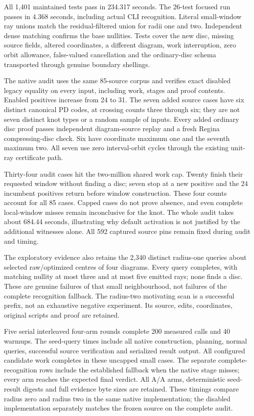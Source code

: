 All 1,401 maintained tests pass in 234.317 seconds. The 26-test focused
run passes in 4.368 seconds, including actual CLI recognition. Literal
small-window ray unions match the residual-filtered union for radii one
and two. Independent dense matching confirms the base nullities. Tests
cover the new disc, missing source fields, altered coordinates, a different
diagram, work interruption, zero orbit allowance, false-valued cancellation
and the ordinary-disc schema transported through genuine boundary shellings.

The native audit uses the same 85-source corpus and verifies exact disabled
legacy equality on every input, including work, stages and proof contents.
Enabled positives increase from 24 to 31. The seven added source cases
have six distinct canonical PD codes, at crossing counts three through six;
they are not seven distinct knot types or a random sample of inputs.
Every added ordinary disc proof passes independent diagram-source replay
and a fresh Regina compressing-disc check. Six have coordinate maximum
one and the seventh maximum two. All seven use zero interval-orbit cycles
through the existing unit-ray certificate path.

Thirty-four audit cases hit the two-million shared work cap. Twenty finish
their requested window without finding a disc; seven stop at a new positive
and the 24 incumbent positives return before window construction. These
four counts account for all 85 cases. Capped cases do not prove absence,
and even complete local-window misses remain inconclusive for the knot.
The whole audit takes about 684.44 seconds, illustrating why default
activation is not justified by the additional witnesses alone. All 592
captured source pins remain fixed during audit and timing.

The exploratory evidence also retains the 2,340 distinct radius-one queries
about selected raw/optimized centres of four diagrams. Every query completes,
with matching nullity at most three and at most five emitted rays; none
finds a disc. These are genuine failures of that small neighbourhood, not
failures of the complete recognition fallback. The radius-two motivating
scan is a successful prefix, not an exhaustive negative experiment.
Its source, edits, coordinates, original scripts and proof are retained.

Five serial interleaved four-arm rounds complete 200 measured calls and
40 warmups. The seed-query times include all native construction, planning,
normal queries, successful source verification and serialized result output.
All configured candidate work completes in these uncapped small cases.
The separate complete-recognition rows include the established fallback
when the native stage misses; every arm reaches the expected final verdict.
All A/A arms, deterministic seed-result digests and full evidence byte sizes
are retained. These timings compare radius zero and radius two in the
same native implementation; the disabled implementation separately matches
the frozen  source on the complete audit.

